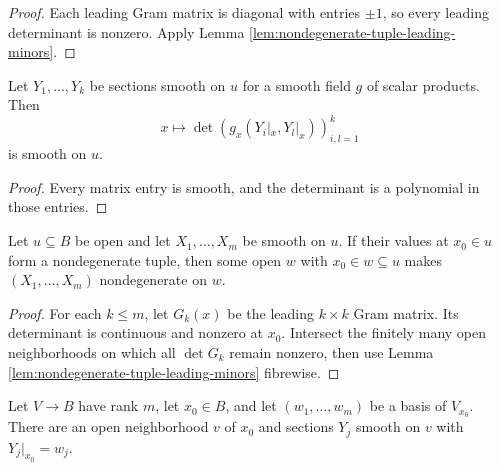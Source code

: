 \begin{proof}

\sketch Each leading Gram matrix is diagonal with entries $\pm1$, so every
leading determinant is nonzero. Apply Lemma
\ref{lem:nondegenerate-tuple-leading-minors}.
\end{proof}

\begin{lemma}
\label{lem:gram-det-smooth}





Let $Y_1,\ldots,Y_k$ be sections smooth on $u$ for a smooth field $g$ of scalar
products. Then
\[
x\longmapsto\det(g_x(Y_i|_x,Y_l|_x))_{i,l=1}^k
\]
is smooth on $u$.
\end{lemma}

\begin{proof}

\sketch Every matrix entry is smooth, and the determinant is a polynomial in
those entries.
\end{proof}

\begin{lemma}
\label{lem:open-nondegenerate-tuple}





Let $u\subseteq B$ be open and let $X_1,\ldots,X_m$ be smooth on $u$. If their
values at $x_0\in u$ form a nondegenerate tuple, then some open
$w$ with $x_0\in w\subseteq u$ makes $(X_1,\ldots,X_m)$ nondegenerate on $w$.
\end{lemma}

\begin{proof}

\sketch For each $k\leq m$, let $G_k(x)$ be the leading $k\times k$ Gram matrix.
Its determinant is continuous and nonzero at $x_0$. Intersect the finitely many
open neighborhoods on which all $\det G_k$ remain nonzero, then use Lemma
\ref{lem:nondegenerate-tuple-leading-minors} fibrewise.
\end{proof}

\begin{lemma}
\label{lem:sections-through-prescribed-basis}




Let $V\to B$ have rank $m$, let $x_0\in B$, and let
$(w_1,\ldots,w_m)$ be a basis of $V_{x_0}$. There are an open neighborhood
$v$ of $x_0$ and sections $Y_j$ smooth on $v$ with $Y_j|_{x_0}=w_j$.
\end{lemma}

